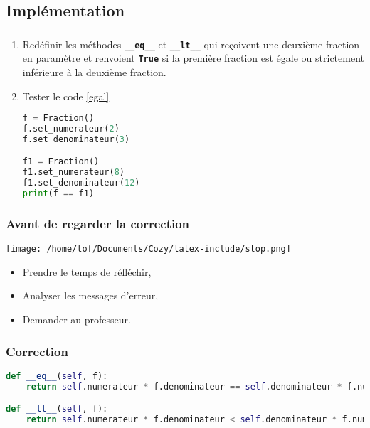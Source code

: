 \documentclass[svgnames,11pt]{beamer}
\begin{document}
\subsection{Implémentation}
\begin{frame}[fragile]
    \frametitle{}
\begin{activite}
\begin{enumerate}
    \item Redéfinir les méthodes \textbf{\texttt{\_\_eq\_\_}} et \textbf{\texttt{\_\_lt\_\_}} qui reçoivent une deuxième fraction en paramètre et renvoient \texttt{\textbf{True}} si la première fraction est égale ou strictement inférieure à la deuxième fraction.
    \item Tester le code \ref{egal}
\begin{center}
\begin{lstlisting}[language=Python , basicstyle=\ttfamily\small, xleftmargin=2em, xrightmargin=1em]
f = Fraction()
f.set_numerateur(2)
f.set_denominateur(3)

f1 = Fraction()
f1.set_numerateur(8)
f1.set_denominateur(12)
print(f == f1)
\end{lstlisting}
\label{egal}
\end{center}
\end{enumerate}
\end{activite}
\end{frame}
\begin{frame}
    \frametitle{Avant de regarder la correction}
\begin{center}
    \centering
    \texttt{[image: /home/tof/Documents/Cozy/latex-include/stop.png]}
    \end{center}
{\Large
    \begin{itemize}
        \item Prendre le temps de réfléchir,
        \item Analyser les messages d'erreur,
        \item Demander au professeur.
    \end{itemize}
}
\end{frame}
\begin{frame}[fragile]
    \frametitle{Correction}

\begin{center}
\begin{lstlisting}[language=Python , basicstyle=\ttfamily\small, xleftmargin=2em, xrightmargin=1em]
def __eq__(self, f):
    return self.numerateur * f.denominateur == self.denominateur * f.numerateur

def __lt__(self, f):
    return self.numerateur * f.denominateur < self.denominateur * f.numerateur

\end{lstlisting}
\end{center}  

\end{frame}
\end{document}
